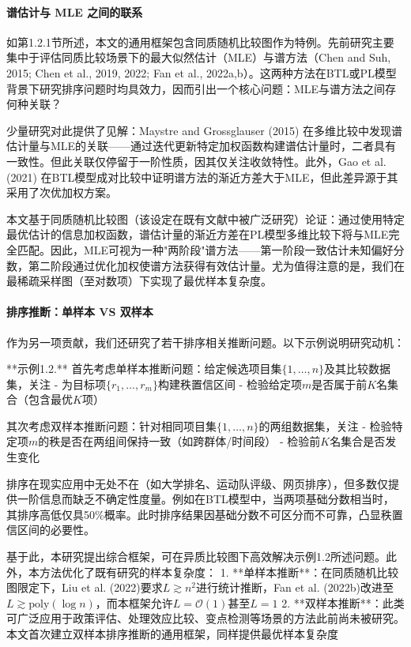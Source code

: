 \paragraph{谱估计与 MLE 之间的联系}

如第1.2.1节所述，本文的通用框架包含同质随机比较图作为特例。先前研究主要集中于评估同质比较场景下的最大似然估计（MLE）与谱方法（Chen and Suh, 2015; Chen et al., 2019, 2022; Fan et al., 2022a,b）。这两种方法在BTL或PL模型背景下研究排序问题时均具效力，因而引出一个核心问题：MLE与谱方法之间存何种关联？

少量研究对此提供了见解：Maystre and Grossglauser (2015) 在多维比较中发现谱估计量与MLE的关联——通过迭代更新特定加权函数构建谱估计量时，二者具有一致性。但此关联仅停留于一阶性质，因其仅关注收敛特性。此外，Gao et al. (2021) 在BTL模型成对比较中证明谱方法的渐近方差大于MLE，但此差异源于其采用了次优加权方案。

本文基于同质随机比较图（该设定在既有文献中被广泛研究）论证：通过使用特定最优估计的信息加权函数，谱估计量的渐近方差在PL模型多维比较下将与MLE完全匹配。因此，MLE可视为一种"两阶段"谱方法——第一阶段一致估计未知偏好分数，第二阶段通过优化加权使谱方法获得有效估计量。尤为值得注意的是，我们在最稀疏采样图（至对数项）下实现了最优样本复杂度。

\paragraph{排序推断：单样本 VS 双样本}

作为另一项贡献，我们还研究了若干排序相关推断问题。以下示例说明研究动机：

**示例1.2.** 首先考虑单样本推断问题：给定候选项目集$\{1,\dots,n\}$及其比较数据集，关注
- 为目标项$\{r_1,\dots,r_m\}$构建秩置信区间
- 检验给定项$m$是否属于前$K$名集合（包含最优$K$项）

其次考虑双样本推断问题：针对相同项目集$\{1,\dots,n\}$的两组数据集，关注
- 检验特定项$m$的秩是否在两组间保持一致（如跨群体/时间段）
- 检验前$K$名集合是否发生变化

排序在现实应用中无处不在（如大学排名、运动队评级、网页排序），但多数仅提供一阶信息而缺乏不确定性度量。例如在BTL模型中，当两项基础分数相当时，其排序高低仅具50\%概率。此时排序结果因基础分数不可区分而不可靠，凸显秩置信区间的必要性。

基于此，本研究提出综合框架，可在异质比较图下高效解决示例1.2所述问题。此外，本方法优化了既有研究的样本复杂度：
1. **单样本推断**：在同质随机比较图限定下，Liu et al. (2022)要求$L \gtrsim n^2$进行统计推断，Fan et al. (2022b)改进至$L \gtrsim \mathrm{poly}(\log n)$，而本框架允许$L = \mathcal{O}(1)$甚至$L = 1$
2. **双样本推断**：此类可广泛应用于政策评估、处理效应比较、变点检测等场景的方法此前尚未被研究。本文首次建立双样本排序推断的通用框架，同样提供最优样本复杂度

